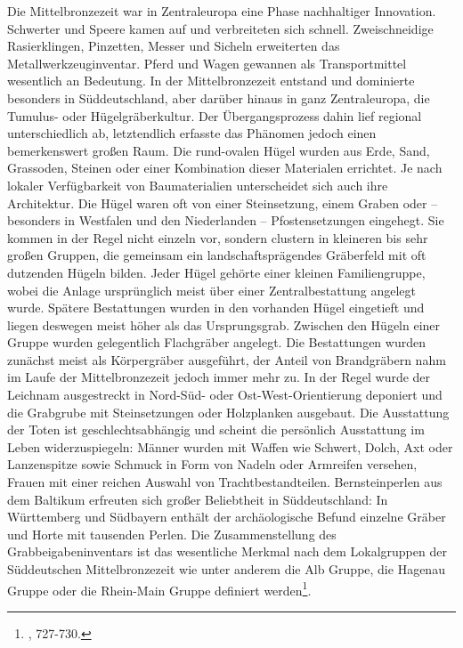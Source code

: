 \documentclass[openany,twoside,twocolumn]{book}
\let\rmarkdownfootnote\footnote%
\def\footnote{\protect\rmarkdownfootnote}
\begin{document}
Die Mittelbronzezeit war in Zentraleuropa eine Phase nachhaltiger
Innovation. Schwerter und Speere kamen auf und verbreiteten sich
schnell. Zweischneidige Rasierklingen, Pinzetten, Messer und Sicheln
erweiterten das Metallwerkzeuginventar. Pferd und Wagen gewannen als
Transportmittel wesentlich an Bedeutung. In der Mittelbronzezeit
entstand und dominierte besonders in Süddeutschland, aber darüber hinaus
in ganz Zentraleuropa, die Tumulus- oder Hügelgräberkultur. Der
Übergangsprozess dahin lief regional unterschiedlich ab, letztendlich
erfasste das Phänomen jedoch einen bemerkenswert großen Raum. Die
rund-ovalen Hügel wurden aus Erde, Sand, Grassoden, Steinen oder einer
Kombination dieser Materialen errichtet. Je nach lokaler Verfügbarkeit
von Baumaterialien unterscheidet sich auch ihre Architektur. Die Hügel
waren oft von einer Steinsetzung, einem Graben oder -- besonders in
Westfalen und den Niederlanden -- Pfostensetzungen eingehegt. Sie kommen
in der Regel nicht einzeln vor, sondern clustern in kleineren bis sehr
großen Gruppen, die gemeinsam ein landschaftsprägendes Gräberfeld mit
oft dutzenden Hügeln bilden. Jeder Hügel gehörte einer kleinen
Familiengruppe, wobei die Anlage ursprünglich meist über einer
Zentralbestattung angelegt wurde. Spätere Bestattungen wurden in den
vorhanden Hügel eingetieft und liegen deswegen meist höher als das
Ursprungsgrab. Zwischen den Hügeln einer Gruppe wurden gelegentlich
Flachgräber angelegt. Die Bestattungen wurden zunächst meist als
Körpergräber ausgeführt, der Anteil von Brandgräbern nahm im Laufe der
Mittelbronzezeit jedoch immer mehr zu. In der Regel wurde der Leichnam
ausgestreckt in Nord-Süd- oder Ost-West-Orientierung deponiert und die
Grabgrube mit Steinsetzungen oder Holzplanken ausgebaut. Die Ausstattung
der Toten ist geschlechtsabhängig und scheint die persönlich Ausstattung
im Leben widerzuspiegeln: Männer wurden mit Waffen wie Schwert, Dolch,
Axt oder Lanzenspitze sowie Schmuck in Form von Nadeln oder Armreifen
versehen, Frauen mit einer reichen Auswahl von Trachtbestandteilen.
Bernsteinperlen aus dem Baltikum erfreuten sich großer Beliebtheit in
Süddeutschland: In Württemberg und Südbayern enthält der archäologische
Befund einzelne Gräber und Horte mit tausenden Perlen. Die
Zusammenstellung des Grabbeigabeninventars ist das wesentliche Merkmal
nach dem Lokalgruppen der Süddeutschen Mittelbronzezeit wie unter
anderem die Alb Gruppe, die Hagenau Gruppe oder die Rhein-Main Gruppe
definiert werden\footnote{\textcite{jockenhovel_germany_2013}, 727-730.}.
\end{document}
